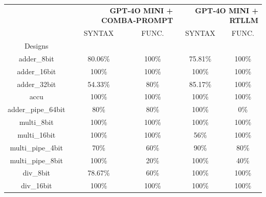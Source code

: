 \begin{tabular}{c|cc|cc}
\toprule
 & \multicolumn{2}{r}{\bfseries GPT‑4O MINI + COMBA-PROMPT } & \multicolumn{2}{r}{\bfseries GPT‑4O MINI + RTLLM } \\
 & SYNTAX & FUNC. & SYNTAX & FUNC. \\
Designs &  &  &  &  \\
\midrule
adder\_8bit & \color{black} {\cellcolor{lightblue}} 80.06\% & \color{black} {\cellcolor{lightgreen}} 100\% & 75.81\% & \color{black} {\cellcolor{lightgreen}} 100\% \\ \midrule
adder\_16bit & \color{black} {\cellcolor{lightblue}} 100\% & \color{black} {\cellcolor{lightgreen}} 100\% & \color{black} {\cellcolor{lightblue}} 100\% & \color{black} {\cellcolor{lightgreen}} 100\% \\ \midrule
adder\_32bit & 54.33\% & 80\% & \color{black} {\cellcolor{lightblue}} 85.17\% & \color{black} {\cellcolor{lightgreen}} 100\% \\ \midrule
accu & \color{black} {\cellcolor{lightblue}} 100\% & \color{black} {\cellcolor{lightgreen}} 100\% & \color{black} {\cellcolor{lightblue}} 100\% & \color{black} {\cellcolor{lightgreen}} 100\% \\ \midrule
adder\_pipe\_64bit & 80\% & \color{black} {\cellcolor{lightgreen}} 80\% & \color{black} {\cellcolor{lightblue}} 100\% & 0\% \\ \midrule
multi\_8bit & \color{black} {\cellcolor{lightblue}} 100\% & \color{black} {\cellcolor{lightgreen}} 100\% & \color{black} {\cellcolor{lightblue}} 100\% & \color{black} {\cellcolor{lightgreen}} 100\% \\ \midrule
multi\_16bit & \color{black} {\cellcolor{lightblue}} 100\% & \color{black} {\cellcolor{lightgreen}} 100\% & 56\% & \color{black} {\cellcolor{lightgreen}} 100\% \\ \midrule
multi\_pipe\_4bit & 70\% & 60\% & \color{black} {\cellcolor{lightblue}} 90\% & \color{black} {\cellcolor{lightgreen}} 80\% \\ \midrule
multi\_pipe\_8bit & \color{black} {\cellcolor{lightblue}} 100\% & 20\% & \color{black} {\cellcolor{lightblue}} 100\% & \color{black} {\cellcolor{lightgreen}} 40\% \\ \midrule
div\_8bit & 78.67\% & 60\% & \color{black} {\cellcolor{lightblue}} 100\% & \color{black} {\cellcolor{lightgreen}} 100\% \\ \midrule
div\_16bit & \color{black} {\cellcolor{lightblue}} 100\% & \color{black} {\cellcolor{lightgreen}} 100\% & \color{black} {\cellcolor{lightblue}} 100\% & \color{black} {\cellcolor{lightgreen}} 100\% \\ \midrule

\end{tabular}
